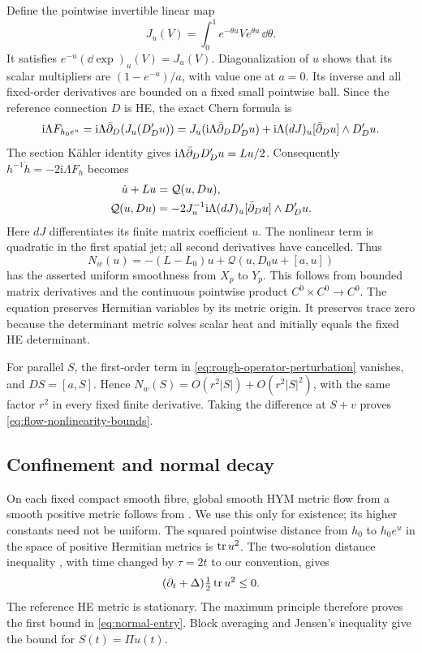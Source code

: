 Define the pointwise invertible linear map
\[
 J_u(V)=\int_0^1e^{-\theta u}Ve^{\theta u}\,\dd\theta.
\]
It satisfies $e^{-u}(\dd\exp)_u(V)=J_u(V)$.
Diagonalization of $u$ shows that its scalar multipliers
are $(1-e^{-a})/a$, with value one at $a=0$.
Its inverse and all fixed-order derivatives are bounded
on a fixed small pointwise ball. Since the reference
connection $D$ is HE, the exact Chern formula is
\[
 \mathrm i\Lambda F_{h_0e^u}
 =\mathrm i\Lambda\bar\partial_D(J_u(D'_Du))
 =J_u(\mathrm i\Lambda\bar\partial_DD'_Du)
       +\mathrm i\Lambda(dJ)_u[\bar\partial_Du]\wedge D'_Du.
\]
The section Kähler identity gives
$\mathrm i\Lambda\bar\partial_DD'_Du=Lu/2$.
Consequently $h^{-1}\dot h=-2\mathrm i\Lambda F_h$ becomes
\begin{equation}\label{eq:first-jet-nonlinearity}
 \begin{split}
 \dot u+Lu&=\mathcal Q(u,Du),\\
 \mathcal Q(u,Du)&=-2J_u^{-1}\mathrm i\Lambda
                       (dJ)_u[\bar\partial_Du]\wedge D'_Du.
 \end{split}
\end{equation}
Here $dJ$ differentiates its finite matrix coefficient $u$.
The nonlinear term is quadratic in the first spatial jet;
all second derivatives have cancelled. Thus
\begin{equation}\label{eq:Nw-definition}
 N_w(u)=-(L-L_0)u+\mathcal Q(u,D_0u+[a,u])
\end{equation}
has the asserted uniform smoothness from $X_p$ to $Y_p$.
This follows from bounded matrix derivatives and the
continuous pointwise product $C^0\times C^0\to C^0$.
The equation preserves Hermitian variables by its metric
origin. It preserves trace zero because the determinant
metric solves scalar heat and initially equals the fixed
HE determinant.

For parallel $S$, the first-order term in
\eqref{eq:rough-operator-perturbation} vanishes, and
$DS=[a,S]$. Hence $N_w(S)=O(r^2|S|)+O(r^2|S|^2)$,
with the same factor $r^2$ in every fixed finite derivative.
Taking the difference at $S+v$ proves
\eqref{eq:flow-nonlinearity-bounds}.

\subsection{Confinement and normal decay}

On each fixed compact smooth fibre, global smooth HYM
metric flow from a smooth positive metric follows from
\cite[Theorem 6.8.25]{Kobayashi}. We use this only for existence;
its higher constants need not be uniform. The squared
pointwise distance from $h_0$ to $h_0e^u$ in the space
of positive Hermitian metrics is $\operatorname{tr} u^2$.
The two-solution distance inequality
\cite[Lemma 6.4.5]{Kobayashi}, with time changed by $\tau=2t$
to our convention, gives
\begin{equation}\label{eq:metric-distance-heat}
          (\partial_t+\Delta)\tfrac12\operatorname{tr} u^2\le0.
\end{equation}
The reference HE metric is stationary. The maximum principle
therefore proves the first bound in \eqref{eq:normal-entry}.
Block averaging and Jensen's inequality give the bound
for $S(t)=\Pi u(t)$.

